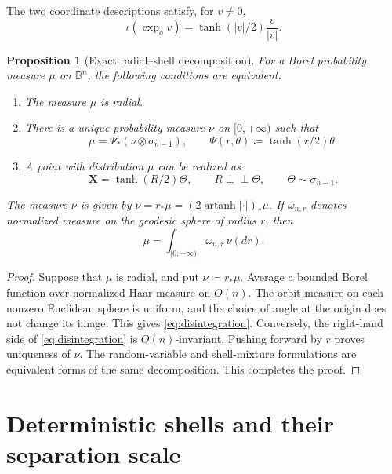 \documentclass{amsart}
\numberwithin{equation}{section}
\theoremstyle{plain}
\newtheorem{prop}[thm]{Proposition}
\theoremstyle{definition}
\theoremstyle{remark}
\newcommand{\B}{\mathbb{B}}
\DeclareMathOperator{\artanh}{artanh}
\begin{document}
The two coordinate descriptions satisfy, for $v\ne0$,
\begin{equation}\label{eq:exp-poincare} \iota(\exp_ov)=\tanh(|v|/2)\frac v{|v|}. \end{equation}

\begin{prop}[Exact radial--shell decomposition]
\label{prop:exact-decomposition}
	For a Borel probability measure $\mu$ on $\B^n$, the following
	conditions are equivalent.
	\begin{enumerate}[label=\textup{(\roman*)}]
	\item The measure $\mu$ is radial.
	\item There is a unique probability measure $\nu$ on $[0,+\infty)$
	such that
	\begin{equation}\label{eq:disintegration}
		\mu=\Psi_*(\nu\otimes\sigma_{n-1}),
		\qquad
		\Psi(r,\theta)\coloneqq\tanh(r/2)\theta.
	\end{equation}
	\item A point with distribution $\mu$ can be realized as
	\begin{equation}\label{eq:random-decomposition}
		\mathbf X=\tanh(R/2)\Theta,
		\qquad
		R\mathbin{\perp\!\!\!\perp}\Theta,
		\qquad
		\Theta\sim\sigma_{n-1}.
	\end{equation}
	\end{enumerate}
	The measure $\nu$ is given by
	$\nu=r_*\mu=(2\artanh|\cdot|)_*\mu$.  If $\omega_{n,r}$ denotes
	normalized measure on the geodesic sphere of radius $r$, then
	\[
		\mu=\int_{[0,+\infty)}\omega_{n,r}\,\nu(dr).
	\]
\end{prop}

\begin{proof}
	Suppose that $\mu$ is radial, and put $\nu\coloneqq r_*\mu$.  Average a
	bounded Borel function over normalized Haar measure on $O(n)$.  The orbit
	measure on each nonzero Euclidean sphere is uniform, and the choice of
	angle at the origin does not change its image.  This gives
	\eqref{eq:disintegration}.  Conversely, the right-hand side of
	\eqref{eq:disintegration} is $O(n)$-invariant.  Pushing forward by $r$
	proves uniqueness of $\nu$.  The random-variable and shell-mixture
	formulations are equivalent forms of the same decomposition.
	This completes the proof.
\end{proof}

\section{Deterministic shells and their separation scale}
\label{sec:shell-reduction}
\end{document}

